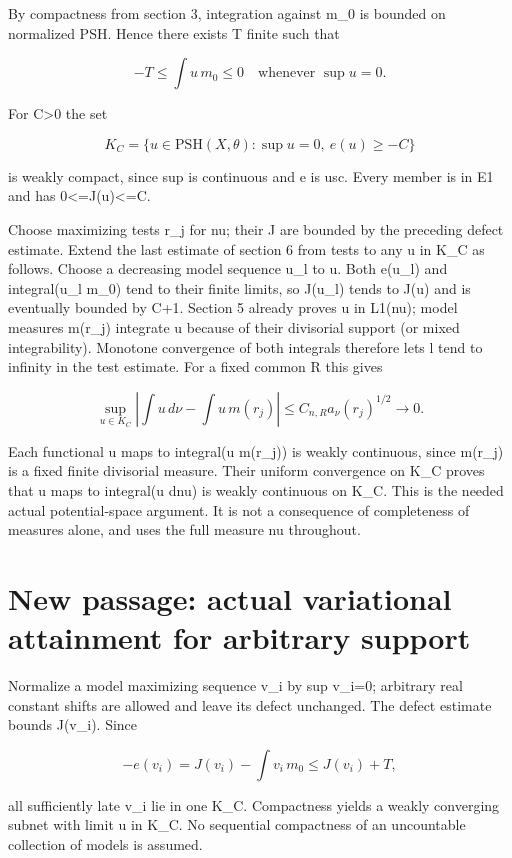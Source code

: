 \documentclass[11pt]{article}
\begin{document}
By compactness from section 3, integration against m\_0 is bounded on normalized PSH. Hence there exists T finite such that

\[
-T\leq\int u\,m_0\leq0\quad\text{whenever }\sup u=0.
\]

For C\textgreater{}0 the set

\[
K_C=\{u\in\mathrm{PSH}(X,\theta):\sup u=0,\ e(u)\geq-C\}
\]

is weakly compact, since sup is continuous and e is usc. Every member is in E1 and has 0\textless{}=J(u)\textless{}=C.

Choose maximizing tests r\_j for nu; their J are bounded by the preceding defect estimate. Extend the last estimate of section 6 from tests to any u in K\_C as follows. Choose a decreasing model sequence u\_l to u. Both e(u\_l) and integral(u\_l m\_0) tend to their finite limits, so J(u\_l) tends to J(u) and is eventually bounded by C+1. Section 5 already proves u in L1(nu); model measures m(r\_j) integrate u because of their divisorial support (or mixed integrability). Monotone convergence of both integrals therefore lets l tend to infinity in the test estimate. For a fixed common R this gives

\[
\sup_{u\in K_C}\left|\int u\,d\nu-\int u\,m(r_j)\right|
\leq C_{n,R}a_\nu(r_j)^{1/2}\longrightarrow0.
\]

Each functional u maps to integral(u m(r\_j)) is weakly continuous, since m(r\_j) is a fixed finite divisorial measure. Their uniform convergence on K\_C proves that u maps to integral(u dnu) is weakly continuous on K\_C. This is the needed actual potential-space argument. It is not a consequence of completeness of measures alone, and uses the full measure nu throughout.

\section{New passage: actual variational attainment for arbitrary support}

Normalize a model maximizing sequence v\_i by sup v\_i=0; arbitrary real constant shifts are allowed and leave its defect unchanged. The defect estimate bounds J(v\_i). Since

\[
-e(v_i)=J(v_i)-\int v_i\,m_0\leq J(v_i)+T,
\]

all sufficiently late v\_i lie in one K\_C. Compactness yields a weakly converging subnet with limit u in K\_C. No sequential compactness of an uncountable collection of models is assumed.
\end{document}
